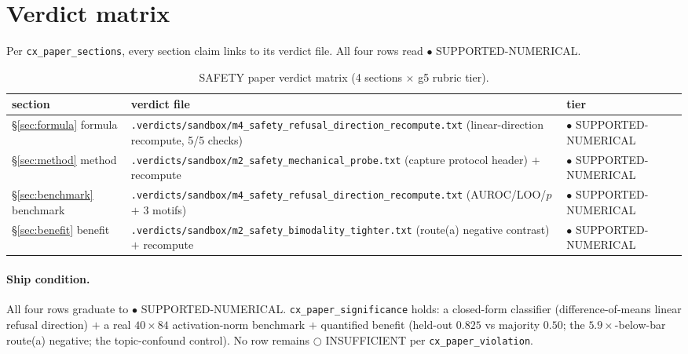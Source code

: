 \documentclass[11pt,a4paper]{article}
\begin{document}
\section{Verdict matrix}
\label{sec:verdict-matrix}
Per \texttt{cx\_paper\_sections}, every section claim links to its verdict file.
All four rows read \(\bullet\) SUPPORTED-NUMERICAL.

\begin{table}[h]
\centering
\caption{SAFETY paper verdict matrix (4 sections \(\times\) g5 rubric tier).}
\begin{tabular}{lll}
\toprule
section & verdict file & tier \\
\midrule
\S\ref{sec:formula} formula     & \texttt{.verdicts/sandbox/m4\_safety\_refusal\_direction\_recompute.txt} (linear-direction recompute, 5/5 checks) & \textcolor{green!50!black}{$\bullet$ SUPPORTED-NUMERICAL} \\
\S\ref{sec:method} method       & \texttt{.verdicts/sandbox/m2\_safety\_mechanical\_probe.txt} (capture protocol header) \(+\) recompute & \textcolor{green!50!black}{$\bullet$ SUPPORTED-NUMERICAL} \\
\S\ref{sec:benchmark} benchmark & \texttt{.verdicts/sandbox/m4\_safety\_refusal\_direction\_recompute.txt} (AUROC/LOO/$p$ \(+\) 3 motifs) & \textcolor{green!50!black}{$\bullet$ SUPPORTED-NUMERICAL} \\
\S\ref{sec:benefit} benefit     & \texttt{.verdicts/sandbox/m2\_safety\_bimodality\_tighter.txt} (route(a) negative contrast) \(+\) recompute & \textcolor{green!50!black}{$\bullet$ SUPPORTED-NUMERICAL} \\
\bottomrule
\end{tabular}
\end{table}

\paragraph{Ship condition.} All four rows graduate to \(\bullet\)
SUPPORTED-NUMERICAL. \texttt{cx\_paper\_significance} holds: a closed-form
classifier (difference-of-means linear refusal direction) \(+\) a real
\(40\times84\) activation-norm benchmark \(+\) quantified benefit (held-out
\(0.825\) vs majority \(0.50\); the \(5.9\times\)-below-bar route(a) negative;
the topic-confound control). No row remains \(\bigcirc\) INSUFFICIENT per
\texttt{cx\_paper\_violation}.

\end{document}

